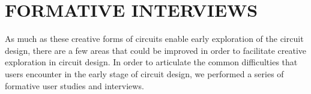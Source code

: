 \documentclass{sigchi}
\begin{document}


\section{FORMATIVE INTERVIEWS}


As much as these creative forms of circuits enable early exploration of the circuit design, there are a few areas that could be improved in order to facilitate creative exploration in circuit design. In order to articulate the common difficulties that users encounter in the early stage of circuit design, we performed a series of formative user studies and interviews.





\end{document}
